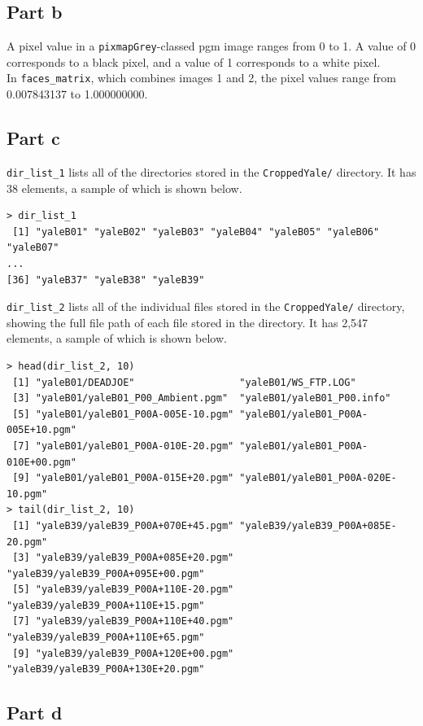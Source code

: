 \documentclass[11pt]{article}
\begin{document}
\subsection*{Part b}

A pixel value in a \texttt{pixmapGrey}-classed pgm image ranges from 0 to 1. A value of 0 corresponds to a black pixel, and a value of 1 corresponds to a white pixel.\\

In \texttt{faces\_matrix}, which combines images 1 and 2, the pixel values range from 0.007843137 to 1.000000000.


\subsection*{Part c}

\texttt{dir\_list\_1} lists all of the directories stored in the \texttt{CroppedYale/} directory. It has 38 elements, a sample of which is shown below.
\begin{verbatim}
> dir_list_1
 [1] "yaleB01" "yaleB02" "yaleB03" "yaleB04" "yaleB05" "yaleB06" "yaleB07"
...
[36] "yaleB37" "yaleB38" "yaleB39"
\end{verbatim}


\texttt{dir\_list\_2} lists all of the individual files stored in the \texttt{CroppedYale/} directory, showing the full file path of each file stored in the directory. It has 2,547 elements, a sample of which is shown below.
\begin{verbatim}
> head(dir_list_2, 10)
 [1] "yaleB01/DEADJOE"                  "yaleB01/WS_FTP.LOG"              
 [3] "yaleB01/yaleB01_P00_Ambient.pgm"  "yaleB01/yaleB01_P00.info"        
 [5] "yaleB01/yaleB01_P00A-005E-10.pgm" "yaleB01/yaleB01_P00A-005E+10.pgm"
 [7] "yaleB01/yaleB01_P00A-010E-20.pgm" "yaleB01/yaleB01_P00A-010E+00.pgm"
 [9] "yaleB01/yaleB01_P00A-015E+20.pgm" "yaleB01/yaleB01_P00A-020E-10.pgm"
> tail(dir_list_2, 10)
 [1] "yaleB39/yaleB39_P00A+070E+45.pgm" "yaleB39/yaleB39_P00A+085E-20.pgm"
 [3] "yaleB39/yaleB39_P00A+085E+20.pgm" "yaleB39/yaleB39_P00A+095E+00.pgm"
 [5] "yaleB39/yaleB39_P00A+110E-20.pgm" "yaleB39/yaleB39_P00A+110E+15.pgm"
 [7] "yaleB39/yaleB39_P00A+110E+40.pgm" "yaleB39/yaleB39_P00A+110E+65.pgm"
 [9] "yaleB39/yaleB39_P00A+120E+00.pgm" "yaleB39/yaleB39_P00A+130E+20.pgm"
\end{verbatim}

\subsection*{Part d}
\end{document}
